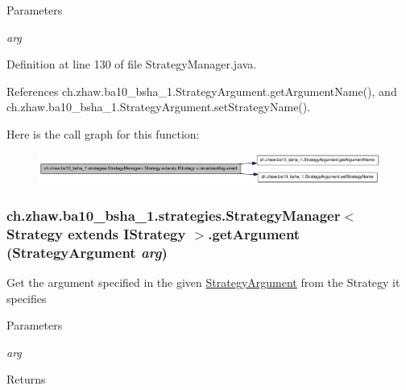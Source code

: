 \begin{DoxyParams}{Parameters}
\item[{\em arg}]\end{DoxyParams}


Definition at line 130 of file StrategyManager.java.

References ch.zhaw.ba10\_\-bsha\_\-1.StrategyArgument.getArgumentName(), and ch.zhaw.ba10\_\-bsha\_\-1.StrategyArgument.setStrategyName().

Here is the call graph for this function:\nopagebreak
\begin{figure}[H]
\begin{center}
\leavevmode
\includegraphics[width=410pt]{classch_1_1zhaw_1_1ba10__bsha__1_1_1strategies_1_1StrategyManager_3_01Strategy_01extends_01IStrategy_01_4_a1bf1d33af692c8658a24d0b935c4f039_cgraph}
\end{center}
\end{figure}
\hypertarget{classch_1_1zhaw_1_1ba10__bsha__1_1_1strategies_1_1StrategyManager_3_01Strategy_01extends_01IStrategy_01_4_adc2e565e79c96210a98da9a84f9d8fbe}{
\subsubsection[{getArgument}]{ ch.zhaw.ba10\_\-bsha\_\-1.strategies.StrategyManager$<$ Strategy extends {\bf IStrategy} $>$.getArgument ({\bf StrategyArgument} {\em arg})}}
\label{classch_1_1zhaw_1_1ba10__bsha__1_1_1strategies_1_1StrategyManager_3_01Strategy_01extends_01IStrategy_01_4_adc2e565e79c96210a98da9a84f9d8fbe}
Get the argument specified in the given \hyperlink{classch_1_1zhaw_1_1ba10__bsha__1_1_1StrategyArgument}{StrategyArgument} from the Strategy it specifies


\begin{DoxyParams}{Parameters}
\item[{\em arg}]\end{DoxyParams}
\begin{DoxyReturn}{Returns}

\end{DoxyReturn}


